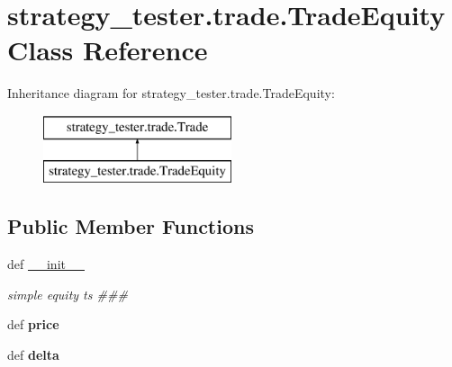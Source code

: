 \hypertarget{classstrategy__tester_1_1trade_1_1TradeEquity}{\section{strategy\-\_\-tester.\-trade.\-Trade\-Equity \-Class \-Reference}
\label{classstrategy__tester_1_1trade_1_1TradeEquity}
}
\-Inheritance diagram for strategy\-\_\-tester.\-trade.\-Trade\-Equity\-:\begin{figure}[H]
\begin{center}
\leavevmode
\includegraphics[height=2.000000cm]{classstrategy__tester_1_1trade_1_1TradeEquity}
\end{center}
\end{figure}
\subsection*{\-Public \-Member \-Functions}
\begin{DoxyCompactItemize}
\item 
\hypertarget{classstrategy__tester_1_1trade_1_1TradeEquity_af714faacbfc9bd2b7a42e09ec6a1c397}{def \hyperlink{classstrategy__tester_1_1trade_1_1TradeEquity_af714faacbfc9bd2b7a42e09ec6a1c397}{\-\_\-\-\_\-init\-\_\-\-\_\-}}\label{classstrategy__tester_1_1trade_1_1TradeEquity_af714faacbfc9bd2b7a42e09ec6a1c397}

\begin{DoxyCompactList}\small\item\em simple equity ts \#\#\# \end{DoxyCompactList}\item 
\hypertarget{classstrategy__tester_1_1trade_1_1TradeEquity_a1e043ac0f3a2badc8db865795d41249a}{def {\bfseries price}}\label{classstrategy__tester_1_1trade_1_1TradeEquity_a1e043ac0f3a2badc8db865795d41249a}

\item 
\hypertarget{classstrategy__tester_1_1trade_1_1TradeEquity_abd1bda6cc4cf73ee4dbbe07d575a3a0a}{def {\bfseries delta}}\label{classstrategy__tester_1_1trade_1_1TradeEquity_abd1bda6cc4cf73ee4dbbe07d575a3a0a}

\end{DoxyCompactItemize}
